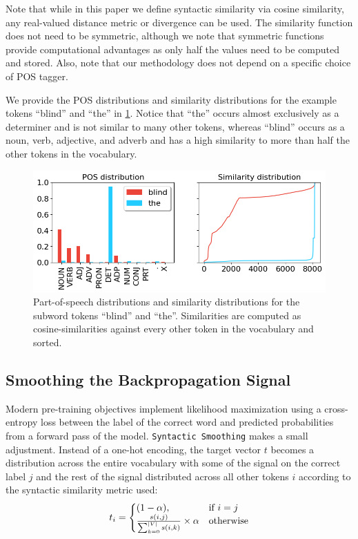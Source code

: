 Note that while in this paper we define syntactic similarity via cosine similarity, any real-valued distance metric or divergence can be used. The similarity function does not need to be symmetric, although we note that symmetric functions provide computational advantages as only half the values need to be computed and stored. Also, note that our methodology does not depend on a specific choice of POS tagger.

We provide the POS distributions and similarity distributions for the example tokens ``blind'' and ``the'' in \cref{fig:distributions}. Notice that ``the'' occurs almost exclusively as a determiner and is not similar to many other tokens, whereas ``blind'' occurs as a noun, verb, adjective, and adverb and has a high similarity to more than half the other tokens in the vocabulary.

\begin{figure}[ht!]
    \centering
    \includegraphics[width=0.8\linewidth]{chapters/syntatic-smoothing/figures/distributions.png}
    \caption{Part-of-speech distributions and similarity distributions for the subword tokens ``blind'' and ``the''. Similarities are computed as cosine-similarities against every other token in the vocabulary and sorted.}
    \label{fig:distributions}
    \vspace{-1em}
\end{figure}

\subsection{Smoothing the Backpropagation Signal}\label{section:smoothing}

Modern pre-training objectives implement likelihood maximization using a cross-entropy loss between the label of the correct word and predicted probabilities from a forward pass of the model. \texttt{Syntactic Smoothing} makes a small adjustment. Instead of a one-hot encoding, the target vector $t$ becomes a distribution across the entire vocabulary with some of the signal on the correct label $j$ and the rest of the signal distributed across all other tokens $i$ according to the syntactic similarity metric used:
\begin{equation}
\label{eq:signal-distribution}
    t_i=\left\{
  \begin{array}{@{}ll@{}}
    (1-\alpha), & \text{if}\ i=j \\
    \frac{s(i,j)}{\sum_{k=0}^{|V|}{s(i,k)}} \times \alpha & \text{otherwise}
  \end{array}\right.
\end{equation}

